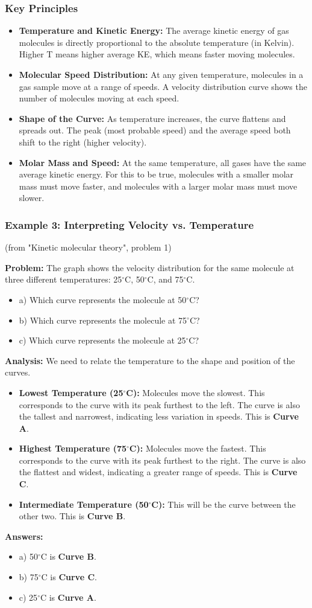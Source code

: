 \documentclass{article}
\begin{document}
\subsubsection{Key Principles}
\begin{itemize}
    \item \textbf{Temperature and Kinetic Energy:} The average kinetic energy of gas molecules is directly proportional to the absolute temperature (in Kelvin). Higher T means higher average KE, which means faster moving molecules.
    \item \textbf{Molecular Speed Distribution:} At any given temperature, molecules in a gas sample move at a range of speeds. A velocity distribution curve shows the number of molecules moving at each speed.
    \item \textbf{Shape of the Curve:} As temperature increases, the curve flattens and spreads out. The peak (most probable speed) and the average speed both shift to the right (higher velocity).
    \item \textbf{Molar Mass and Speed:} At the same temperature, all gases have the same average kinetic energy. For this to be true, molecules with a smaller molar mass must move faster, and molecules with a larger molar mass must move slower.
\end{itemize}

\subsubsection{Example 3: Interpreting Velocity vs. Temperature}
(from "Kinetic molecular theory", problem 1)

\textbf{Problem:} The graph shows the velocity distribution for the same molecule at three different temperatures: 25$^{\circ}$C, 50$^{\circ}$C, and 75$^{\circ}$C.
\begin{itemize}
    \item a) Which curve represents the molecule at 50$^{\circ}$C?
    \item b) Which curve represents the molecule at 75$^{\circ}$C?
    \item c) Which curve represents the molecule at 25$^{\circ}$C?
\end{itemize}
\textbf{Analysis:} We need to relate the temperature to the shape and position of the curves.
\begin{itemize}
    \item \textbf{Lowest Temperature (25$^{\circ}$C):} Molecules move the slowest. This corresponds to the curve with its peak furthest to the left. The curve is also the tallest and narrowest, indicating less variation in speeds. This is \textbf{Curve A}.
    \item \textbf{Highest Temperature (75$^{\circ}$C):} Molecules move the fastest. This corresponds to the curve with its peak furthest to the right. The curve is also the flattest and widest, indicating a greater range of speeds. This is \textbf{Curve C}.
    \item \textbf{Intermediate Temperature (50$^{\circ}$C):} This will be the curve between the other two. This is \textbf{Curve B}.
\end{itemize}

\textbf{Answers:}
\begin{itemize}
    \item a) 50$^{\circ}$C is \textbf{Curve B}.
    \item b) 75$^{\circ}$C is \textbf{Curve C}.
    \item c) 25$^{\circ}$C is \textbf{Curve A}.
\end{itemize}
\end{document}

